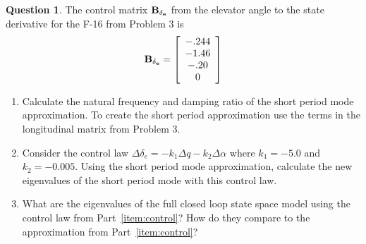 \documentclass{article}
\theoremstyle{definition}
\newtheorem{question}{Question}
\begin{document}
\begin{question}
    The control matrix ${\bf B_{\delta_e}}$ from the elevator angle to the state derivative for the F-16 from Problem 3 is
    \begin{equation} \nonumber
    {\bf B_{\delta_e}} = 
    \left[ \begin{array}{c} 
    -.244 \\
    -1.46 \\
    -.20 \\
    0
    \end{array} \right]
    \end{equation}
    
    \begin{enumerate}[label=(\alph*)]
    \item Calculate the natural frequency and damping ratio of the short period mode approximation. To create the short period approximation use the terms in the longitudinal matrix from Problem 3.
    \item Consider the control law $\Delta \delta_e = -k_1 \Delta q - k_2 \Delta \alpha$ where $k_1 = -5.0$ and $k_2 = -0.005$. Using the short period mode approximation, calculate the new eigenvalues of the short period mode with this control law. \label{item:control}
    \item What are the eigenvalues of the full closed loop state space model using the control law from Part~\ref{item:control}? How do they compare to the approximation from Part~\ref{item:control}?
    \end{enumerate}
\end{question}

\vspace{0.1cm}
\clearpage

\vspace{6cm}
\end{document}
